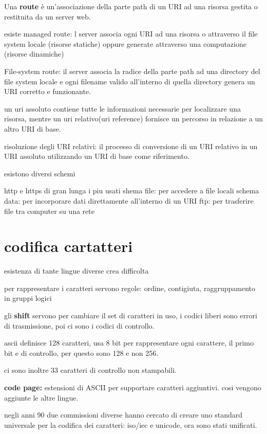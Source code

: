\documentclass[12pt]{article}
\begin{document}
Una \textbf{route} è un'associazione della parte path di un URI ad una
risorsa gestita o restituita da un server web.

esiste managed route: l server associa ogni URI ad una risorsa o
attraverso il file system locale (risorse statiche) oppure
generate attraverso una computazione (risorse dinamiche)

File-system route: il server associa la radice della parte path
ad una directory del file system locale e ogni filename valido
all'interno di quella directory genera un URI corretto e
funzionante.

un uri assoluto contiene tutte le informazioni necessarie per localizzare una risorsa, mentre un uri relativo(uri reference) fornisce un percorso in relazione a un altro URI di base.

risoluzione degli URI relativi: il processo di conversione di un URI relativo in un URI assoluto utilizzando un URI di base come riferimento.

esistono diversi schemi

http e https di gran lunga i piu usati
shema file: per accedere a file locali
schema data: per incorporare dati direttamente all'interno di un URI
ftp: per trasferire file tra computer su una rete

\section{codifica cartatteri}

esistenza di tante lingue diverse crea difficolta

per rappresentare i caratteri servono regole:
ordine,
contigiuta,
raggruppamento in gruppi logici

gli \textbf{shift} servono per cambiare il set di caratteri in uso, i codici liberi sono errori di trasmissione, poi ci sono i codici di controllo.

ascii definisce 128 caratteri, usa 8 bit per rappresentare ogni carattere, il primo bit e di controllo, per questo sono 128 e non 256.

ci sono inoltre 33 caratteri di controllo non stampabili.

\textbf{code page:} estensioni di ASCII per supportare caratteri aggiuntivi. cosi vengono aggiunte le altre lingue.

negli anni 90 due commissioni diverse hanno cercato di creare uno standard universale per la codifica dei caratteri:
iso/iec e unicode, ora sono stati unificati.
\end{document}
